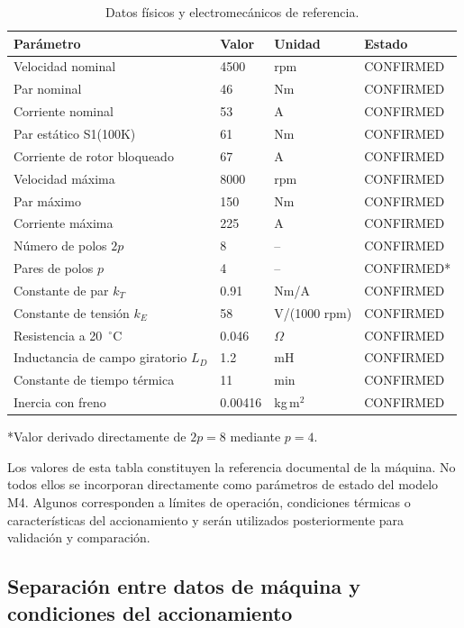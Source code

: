 \begin{table}[H]
\centering
\caption{Datos físicos y electromecánicos de referencia.}
\label{tab:parametros_documentales}
\begin{tabular}{llll}
\toprule
Parámetro & Valor & Unidad & Estado \\
\midrule
Velocidad nominal & 4500 & rpm & CONFIRMED \\
Par nominal & 46 & Nm & CONFIRMED \\
Corriente nominal & 53 & A & CONFIRMED \\
Par estático S1(100K) & 61 & Nm & CONFIRMED \\
Corriente de rotor bloqueado & 67 & A & CONFIRMED \\
Velocidad máxima & 8000 & rpm & CONFIRMED \\
Par máximo & 150 & Nm & CONFIRMED \\
Corriente máxima & 225 & A & CONFIRMED \\
Número de polos $2p$ & 8 & -- & CONFIRMED \\
Pares de polos $p$ & 4 & -- & CONFIRMED* \\
Constante de par $k_T$ & 0.91 & Nm/A & CONFIRMED \\
Constante de tensión $k_E$ & 58 & V/(1000 rpm) & CONFIRMED \\
Resistencia a 20~$^\circ$C & 0.046 & $\Omega$ & CONFIRMED \\
Inductancia de campo giratorio $L_D$ & 1.2 & mH & CONFIRMED \\
Constante de tiempo térmica & 11 & min & CONFIRMED \\
Inercia con freno & 0.00416 & kg\,m$^2$ & CONFIRMED \\
\bottomrule
\end{tabular}

\smallskip
\footnotesize
*Valor derivado directamente de $2p=8$ mediante $p=4$.
\end{table}

Los valores de esta tabla constituyen la referencia documental de la máquina. No todos ellos se incorporan directamente como parámetros de estado del modelo M4. Algunos corresponden a límites de operación, condiciones térmicas o características del accionamiento y serán utilizados posteriormente para validación y comparación.

\subsection{Separación entre datos de máquina y condiciones del accionamiento}

